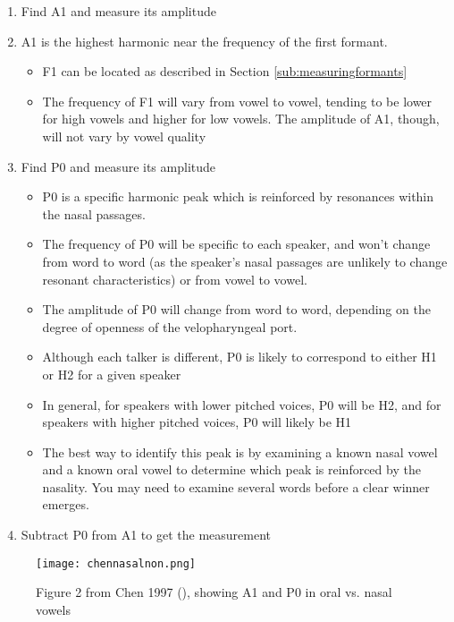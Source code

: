 \documentclass[11pt]{article}
\def\tightlist{}
\begin{document}
\begin{enumerate}
\def\labelenumi{\arabic{enumi}.}
\tightlist
\item
  Find A1 and measure its amplitude
\item
  A1 is the highest harmonic near the frequency of the first formant.

  \begin{itemize}
  \tightlist
  \item
    F1 can be located as described in Section
    \ref{sub:measuringformants}
  \item
    The frequency of F1 will vary from vowel to vowel, tending to be
    lower for high vowels and higher for low vowels. The amplitude of
    A1, though, will not vary by vowel quality
  \end{itemize}
\item
  Find P0 and measure its amplitude

  \begin{itemize}
  \tightlist
  \item
    P0 is a specific harmonic peak which is reinforced by resonances
    within the nasal passages.
  \item
    The frequency of P0 will be specific to each speaker, and won't
    change from word to word (as the speaker's nasal passages are
    unlikely to change resonant characteristics) or from vowel to vowel.
  \item
    The amplitude of P0 will change from word to word, depending on the
    degree of openness of the velopharyngeal port.
  \item
    Although each talker is different, P0 is likely to correspond to
    either H1 or H2 for a given speaker
  \item
    In general, for speakers with lower pitched voices, P0 will be H2,
    and for speakers with higher pitched voices, P0 will likely be H1
  \item
    The best way to identify this peak is by examining a known nasal
    vowel and a known oral vowel to determine which peak is reinforced
    by the nasality. You may need to examine several words before a
    clear winner emerges.
  \end{itemize}
\item
  Subtract P0 from A1 to get the measurement
\end{enumerate}

\begin{figure}
  \centerline{
    \mbox{\texttt{[image: chennasalnon.png]}}
  }
  \caption{Figure 2 from Chen 1997 (\cite{Chen:1997vr}), showing A1 and P0 in oral vs. nasal vowels \label{chennasalnon}}

  \end{figure}
\end{document}
